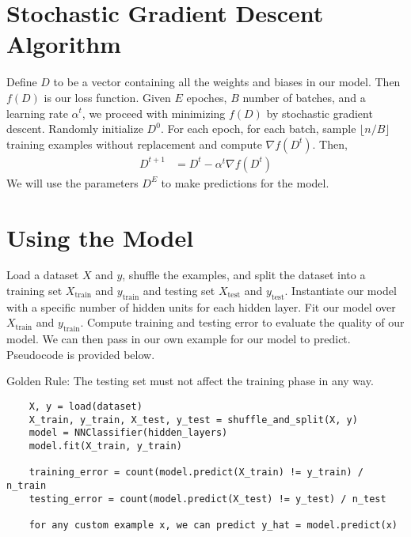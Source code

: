 \documentclass{article}
\begin{document}
\vspace{1cm}

\section{Stochastic Gradient Descent Algorithm}
Define $D$ to be a vector containing all the weights and biases in our model. Then $f(D)$ is our loss function. Given $E$ epoches, $B$ number of batches, and a learning rate $\alpha^t$, we proceed with minimizing $f(D)$ by stochastic gradient descent. Randomly initialize $D^0$. For each epoch, for each batch, sample $\lfloor n / B \rfloor$ training examples without replacement and compute $\nabla f(D^{t})$. Then,
\begin{align*}
    D^{t+1} &= D^{t} - \alpha^t \nabla f(D^{t}) 
\end{align*}
We will use the parameters $D^E$ to make predictions for the model. 

\vspace{1cm}

\section{Using the Model}
Load a dataset $X$ and $y$, shuffle the examples, and split the dataset into a training set $X_{\text{train}}$ and $y_{\text{train}}$ and testing set $X_{\text{test}}$ and $y_{\text{test}}$. Instantiate our model with a specific number of hidden units for each hidden layer. Fit our model over $X_{\text{train}}$ and $y_{\text{train}}$. Compute training and testing error to evaluate the quality of our model. We can then pass in our own example for our model to predict. Pseudocode is provided below. 
\vspace{1mm}

\noindent Golden Rule: The testing set must not affect the training phase in any way.

\begin{verbatim}
    X, y = load(dataset)
    X_train, y_train, X_test, y_test = shuffle_and_split(X, y)
    model = NNClassifier(hidden_layers)
    model.fit(X_train, y_train)
    
    training_error = count(model.predict(X_train) != y_train) / n_train 
    testing_error = count(model.predict(X_test) != y_test) / n_test
    
    for any custom example x, we can predict y_hat = model.predict(x) 
\end{verbatim}
\end{document}
